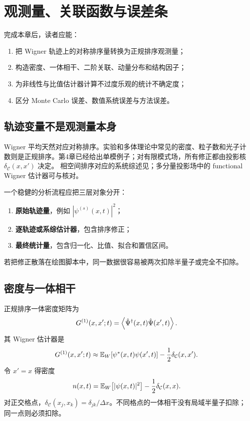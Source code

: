 \chapter{观测量、关联函数与误差条}
\label{ch:observables}

\begin{learningobjectives}
完成本章后，读者应能：
\begin{enumerate}
  \item 把 Wigner 轨迹上的对称排序量转换为正规排序观测量；
  \item 构造密度、一体相干、二阶关联、动量分布和结构因子；
  \item 为非线性与比值估计器计算不过度乐观的统计不确定度；
  \item 区分 Monte Carlo 误差、数值系统误差与方法误差。
\end{enumerate}
\end{learningobjectives}

\section{轨迹变量不是观测量本身}

Wigner 平均天然对应对称排序。实验和多体理论中常见的密度、粒子数和光子计数则是正规排序。第4章已经给出单模例子；对有限模式场，所有修正都由投影核 $\delta_{\mathcal C}(x,x')$ 决定。
相空间排序对应的系统综述见\cite{Hillery1984}；多分量投影场中的 functional
Wigner 估计器可与\cite{Opanchuk2013}核对。

一个稳健的分析流程应把三层对象分开：
\begin{enumerate}
  \item \textbf{原始轨迹量}，例如 $|\psi^{(s)}(x,t)|^2$；
  \item \textbf{逐轨迹或系综估计器}，包含排序修正；
  \item \textbf{最终统计量}，包含归一化、比值、拟合和置信区间。
\end{enumerate}
若把修正散落在绘图脚本中，同一数据很容易被两次扣除半量子或完全不扣除。

\section{密度与一体相干}

正规排序一体密度矩阵为
\begin{equation}
  G^{(1)}(x,x';t)
  =\left\langle \hat{\Psi}^{\dagger}(x,t)\hat{\Psi}(x',t)\right\rangle.
\end{equation}
其 Wigner 估计器是
\begin{equation}
  G^{(1)}(x,x';t)
  \approx
  \mathbb{E}_{W}\!\left[\psi^*(x,t)\psi(x',t)\right]
  -\frac12\delta_{\mathcal C}(x,x').
  \label{eq:g1-wigner-estimator}
\end{equation}
令 $x'=x$ 得密度
\begin{equation}
  n(x,t)=\mathbb{E}_{W}\!\left[|\psi(x,t)|^2\right]
  -\frac12\delta_{\mathcal C}(x,x).
  \label{eq:density-wigner-estimator}
\end{equation}
对正交格点，$\delta_{\mathcal C}(x_j,x_k)=\delta_{jk}/\Delta x$。不同格点的一体相干没有局域半量子扣除；同一点则必须扣除。

